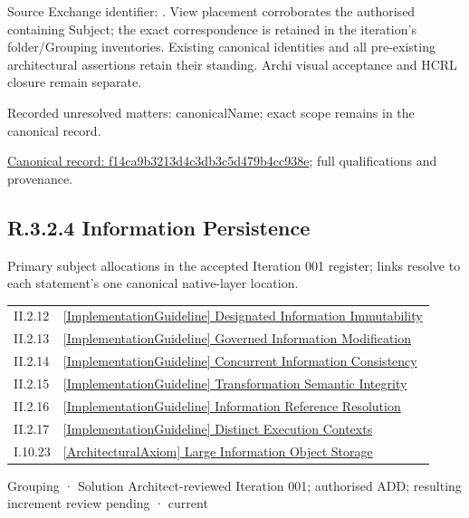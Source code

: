 Source Exchange identifier: \texttt{}. View placement corroborates
the authorised containing Subject; the exact correspondence is retained in the
iteration's folder/Grouping inventories. Existing canonical identities and all
pre-existing architectural assertions retain their standing. Archi visual
acceptance and HCRL closure remain separate.


{\small Recorded unresolved matters: canonicalName; exact scope remains in the canonical record.}\par
{\footnotesize \href{../../../../continuum/grouping/f14ca9b3213d4c3db3c5d479b4cc938e.md}{Canonical record: f14ca9b3213d4c3db3c5d479b4cc938e}; full qualifications and provenance.}\par
\subsection*{R.3.2.4 Information Persistence}
\label{navigation:R.3.2.4}

Primary subject allocations in the accepted Iteration 001 register; links resolve to each statement’s one canonical native-layer location.\par
\begin{longtable}{p{.22\linewidth}p{.73\linewidth}}
II.2.12 & \hyperref[element:f9ac3424852f4c30b5b152c7a007c704]{[ImplementationGuideline] Designated Information Immutability} \\
II.2.13 & \hyperref[element:d08bf41d719c43e3bc1a54bd79d95741]{[ImplementationGuideline] Governed Information Modification} \\
II.2.14 & \hyperref[element:0b0be077a4d449e29d72048634e276e4]{[ImplementationGuideline] Concurrent Information Consistency} \\
II.2.15 & \hyperref[element:45c752faef034d3eb04ef6580f1dcc97]{[ImplementationGuideline] Transformation Semantic Integrity} \\
II.2.16 & \hyperref[element:b5c3dcfd6ece40fdb6c8694924db2ae6]{[ImplementationGuideline] Information Reference Resolution} \\
II.2.17 & \hyperref[element:d0af3f7b7f9947008b3b066eefe73617]{[ImplementationGuideline] Distinct Execution Contexts} \\
I.10.23 & \hyperref[element:06ac0b10e0614c5cb33499c1e6c4edc7]{[ArchitecturalAxiom] Large Information Object Storage} \\
\end{longtable}
\label{element:8b7fd22a55434e5ca3e7ba87afb020d6}
{\small Grouping · Solution Architect-reviewed Iteration 001; authorised ADD; resulting increment review pending · current}\par

